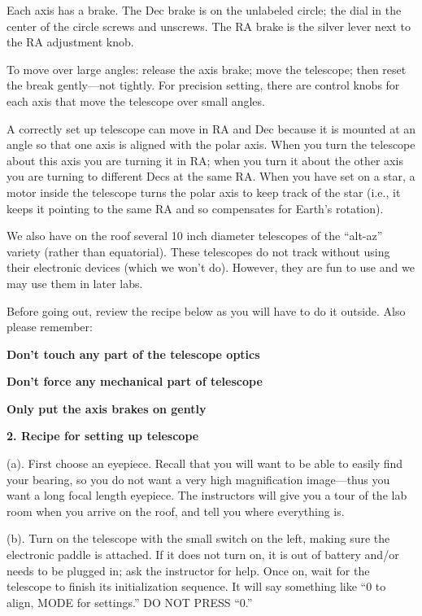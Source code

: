 \medskip\noindent Each axis has a brake. The Dec brake is on the
unlabeled circle; the dial in the center of the circle screws and
unscrews. The RA brake is the silver lever next to the RA adjustment
knob.

\medskip\noindent To move over large angles: release the axis brake;
move the telescope; then reset the break gently---not tightly. For
precision setting, there are control knobs for each axis that move the
telescope over small angles.

\noindent
A correctly set up telescope can move in RA and Dec because it is
mounted at an angle so that one axis is aligned with the polar
axis. When you turn the telescope about this axis you are turning it
in RA; when you turn it about the other axis you are turning to
different Decs at the same RA. When you have set on a star, a motor
inside the telescope turns the polar axis to keep track of the star
(i.e., it keeps it pointing to the same RA and so compensates for
Earth's rotation).

\noindent
We also have on the roof several 10 inch diameter telescopes of the
``alt-az'' variety (rather than equatorial).  These telescopes do not
track without using their electronic devices (which we won't
do). However, they are fun to use and we may use them in later labs.

\medskip\noindent
Before going out, review the recipe below as you will have to do it
outside. Also please remember:

\bigskip
\centerline{\bf Don't touch any part of the telescope optics} 

\medskip
\centerline{\bf Don't force any mechanical part of telescope} 

\medskip
\centerline{\bf Only put the axis brakes on gently}

\medskip
\medskip
\bigskip
\noindent
{\bf 2. Recipe for setting up telescope}

\medskip\noindent (a). First choose an eyepiece.  Recall that you will
want to be able to easily find your bearing, so you do not want a very
high magnification image---thus you want a long focal length
eyepiece. The instructors will give you a tour of the lab room when
you arrive on the roof, and tell you where everything is.

\medskip\noindent (b). Turn on the telescope with the small switch on
the left, making sure the electronic paddle is attached. If it does
not turn on, it is out of battery and/or needs to be plugged in; ask
the instructor for help. Once on, wait for the telescope to finish its
initialization sequence. It will say something like ``0 to align, MODE
for settings.'' DO NOT PRESS ``0.''

